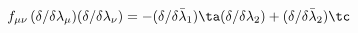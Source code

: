 \begin{equation}
f_{\mu\nu}\,(\delta/{\delta\lambda_\mu})(\delta/{\delta\lambda_\nu})=
-(\delta/{\delta{\bar\lambda}_1})\ta (\delta/{\delta{\lambda}_2})+
(\delta/{\delta{\bar\lambda}_2}) \tc
\end{equation}

